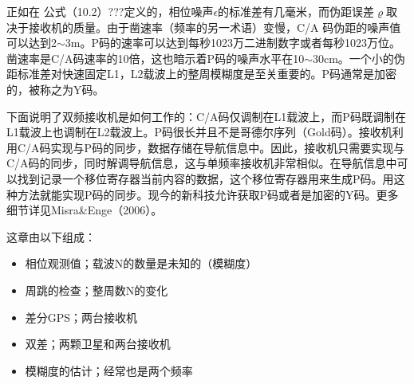 	正如在 公式（10.2）???定义的，相位噪声$\epsilon$的标准差有几毫米，而伪距误差$\varrho$取决于接收机的质量。由于凿速率（频率的另一术语）变慢，C/A 码伪距的噪声值可以达到2$\sim$3m。P码的速率可以达到每秒1023万二进制数字或者每秒1023万位。凿速率是C/A码速率的10倍，这也暗示着P码的噪声水平在10$\sim$30cm。一个小的伪距标准差对快速固定L1，L2载波上的整周模糊度是至关重要的。P码通常是加密的，被称之为Y码。
	
	下面说明了双频接收机是如何工作的：C/A码仅调制在L1载波上，而P码既调制在L1载波上也调制在L2载波上。P码很长并且不是哥德尔序列（Gold码）。接收机利用C/A码实现与P码的同步，数据存储在导航信息中。因此，接收机只需要实现与C/A码的同步，同时解调导航信息，这与单频率接收机非常相似。在导航信息中可以找到记录一个移位寄存器当前内容的数据，这个移位寄存器用来生成P码。用这种方法就能实现P码的同步。现今的新科技允许获取P码或者是加密的Y码。更多细节详见Misra\&Enge（2006）。
	
	这章由以下组成：	
	\begin{itemize}
		\item 相位观测值；载波N的数量是未知的（模糊度）
		\item 周跳的检查；整周数N的变化
		\item 差分GPS；两台接收机
		\item 双差；两颗卫星和两台接收机
		\item 模糊度的估计；经常也是两个频率
	\end{itemize}
	

